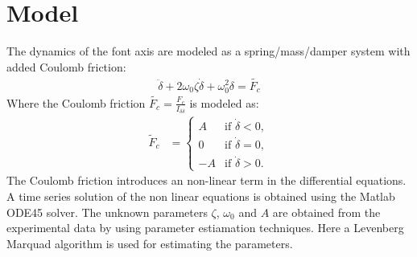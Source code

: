 \section{Model}
The dynamics of the font axis are modeled as a spring/mass/damper system with added Coulomb friction:
		\begin{align}
		\ddot{\delta} + 2\omega_0\zeta\dot{\delta} + \omega_0^2\delta =\tilde{F_c} 
		\end{align}
Where the Coulomb friction $\tilde{F_c} = \frac{F_c}{I_{\delta\delta}}$ is modeled as:
		\begin{align}
		\tilde{F}_c &= \left\{
				\begin{array}{rl}
				 A & \text{if } \dot{\delta} < 0,\\
				0 & \text{if } \dot{\delta} = 0 ,\\
							-A & \text{if } \dot{\delta} > 0.
				\end{array} \right.
		\end{align}
The Coulomb friction introduces an non-linear term in the differential equations. A time series solution of the non linear equations is obtained using the Matlab ODE45 solver. The unknown parameters $\zeta$, $\omega_0$ and $A$ are obtained from the experimental data by using parameter estiamation techniques. Here a Levenberg Marquad algorithm is used for estimating the parameters. 
